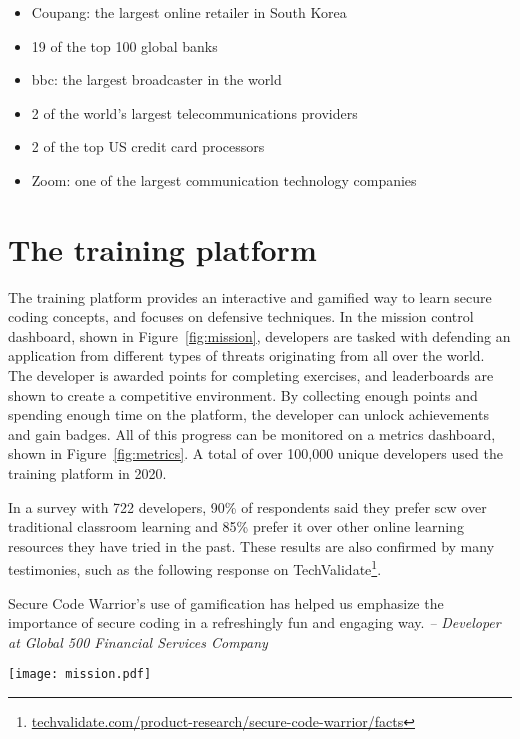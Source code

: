 \begin{itemize}
\setlength\itemsep{0em}
    \item Coupang: the largest online retailer in South Korea
    \item 19 of the top 100 global banks
    \item \gls{bbc}: the largest broadcaster in the world
    \item 2 of the world's largest telecommunications providers
    \item 2 of the top US credit card processors
    \item Zoom: one of the largest communication technology companies
\end{itemize}

\section{The training platform}

The training platform provides an interactive and gamified way to learn secure coding concepts, and focuses on defensive techniques. 
In the mission control dashboard, shown in Figure~\ref{fig:mission}, developers are tasked with defending an application from different types of threats originating from all over the world.
The developer is awarded points for completing exercises, and leaderboards are shown to create a competitive environment.
By collecting enough points and spending enough time on the platform, the developer can unlock achievements and gain badges.
All of this progress can be monitored on a metrics dashboard, shown in Figure~\ref{fig:metrics}.
A total of over 100,000 unique developers used the training platform in 2020.

In a survey with 722 developers, 90\% of respondents said they prefer \gls{scw} over traditional classroom learning
and 85\% prefer it over other online learning resources they have tried in the past.
These results are also confirmed by many testimonies, such as the following response on TechValidate\footnote{\url{techvalidate.com/product-research/secure-code-warrior/facts}}. 

\begin{displayquote}
Secure Code Warrior’s use of gamification has helped us emphasize the importance of secure coding in a refreshingly fun and engaging way. \textit{-- Developer at Global 500 Financial Services Company}
\end{displayquote}

\begin{sidewaysfigure}
  \centering
  \texttt{[image: mission.pdf]}
  \caption[SCW mission control dashboard]{The mission control dashboard on the \gls{scw} platform creates a gamified overview of the exercises.}
  \label{fig:mission} 
\end{sidewaysfigure}

